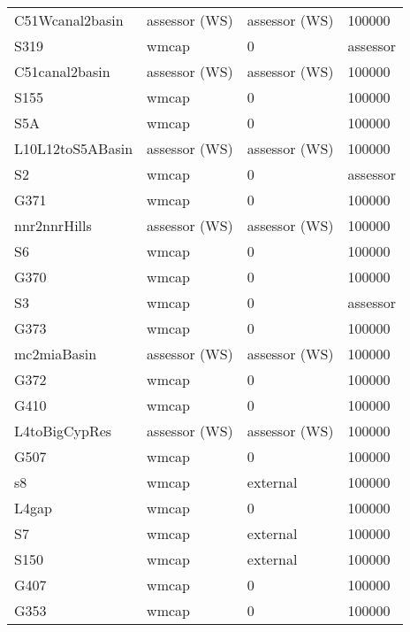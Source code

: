 \begin{table}[!htb]
\begin{center}
\begin{tabular}{p{2.5cm}p{2.0cm}p{2.0cm}p{2.0cm}}
  C51Wcanal2basin  &assessor (WS)   &assessor (WS)    & 100000  \\
  S319             &wmcap           & 0               & assessor\\
  C51canal2basin   &assessor (WS)   &assessor (WS)    & 100000  \\
  S155             &wmcap           & 0               & 100000  \\
  S5A              &wmcap           & 0               & 100000  \\
  L10L12toS5ABasin &assessor (WS)   &assessor (WS)    & 100000  \\
  S2               &wmcap           & 0               &assessor \\
  G371             &wmcap           & 0               & 100000  \\
  nnr2nnrHills     &assessor (WS)   &assessor (WS)    & 100000  \\
  S6               &wmcap           & 0               & 100000  \\
  G370             &wmcap           & 0               & 100000  \\
  S3               &wmcap           & 0               &assessor \\
  G373             &wmcap           & 0               & 100000  \\
  mc2miaBasin      &assessor (WS)   &assessor (WS)    & 100000  \\
  G372             &wmcap           & 0               & 100000  \\
  G410             &wmcap           & 0               & 100000  \\
  L4toBigCypRes    &assessor (WS)   &assessor (WS)    & 100000  \\
  G507             &wmcap           & 0               & 100000  \\
  s8               &wmcap           &external         & 100000  \\
  L4gap            &wmcap           & 0               & 100000  \\
  S7               &wmcap           &external         & 100000  \\
  S150             &wmcap           &external         & 100000  \\
  G407             &wmcap           & 0               & 100000  \\
  G353             &wmcap           & 0               & 100000  \\
  \hline                                                                            
  \end{tabular}
 \end{center}
\end{table}
\normalsize

